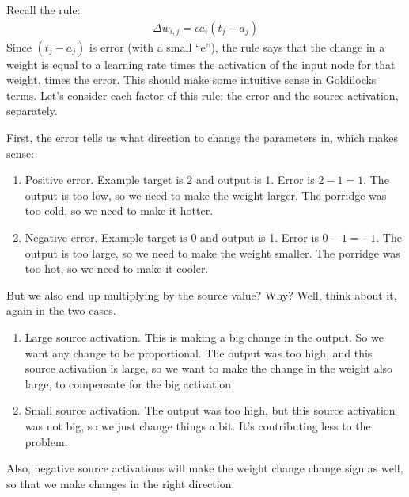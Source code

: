  
Recall the rule:
\begin{eqnarray*}
\Delta w_{i,j}  =  \epsilon a_i (t_j - a_j)
\end{eqnarray*}
Since $(t_j - a_j)$ is error  (with a small ``e''), the rule says that the change in a weight is equal to a learning rate times the activation of the input node for that weight, times the error. This should make some intuitive sense in Goldilocks terms. Let's consider each factor of this rule: the error and the source activation, separately.

First, the error tells us what direction to change the parameters in, which makes sense:
\begin{enumerate}
\item Positive error. Example target is 2 and output is 1. Error is $2-1 = 1$. The output is too low, so we need to make the weight larger. The porridge was too cold, so we need to make it hotter. 
\item Negative error. Example target is 0 and output is 1. Error is $0-1 = -1$. The output is too large, so we need to make the weight smaller. The porridge was too hot, so we need to make it cooler. 
\end{enumerate}

But we also end up multiplying by the source value? Why? Well, think about it, again in the two cases.
\begin{enumerate}
\item Large source activation. This is making a big change in the output. So we want any change to be proportional. The output was too high, and this source activation is large, so we want to make the change in the weight also large, to compensate for the big activation
\item Small source activation. The output was too high, but this source activation was not big, so we just change things a bit. It's contributing less to the problem.
\end{enumerate}
Also, negative source activations will make the weight change change sign as well, so that we make changes in the right direction. %

